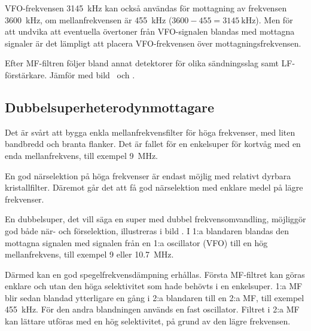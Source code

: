 \begin{exempelbox}
VFO-frekvensen \qty{3145}{\kilo\hertz} kan också användas för mottagning av
frekvensen \qty{3600}{\kilo\hertz}, om mellanfrekvensen är \qty{455}{\kilo\hertz}
(\(3600 - 455 = \qty{3145}{\kilo\hertz}\)).
Men för att undvika att eventuella övertoner från VFO-signalen blandas med
mottagna signaler är det lämpligt att placera VFO-frekvensen över
mottagningsfrekvensen.
\end{exempelbox}

Efter MF-filtren följer bland annat detektorer för olika sändningsslag samt
LF-förstärkare.
Jämför med bild~ och .

\subsection{Dubbelsuperheterodynmottagare}

Det är svårt att bygga enkla mellanfrekvensfilter för höga frekvenser,
med liten bandbredd och branta flanker.
Det är fallet för en enkelsuper för kortvåg med en enda mellanfrekvens, till
exempel \qty{9}{\mega\hertz}.

En god närselektion på höga frekvenser är endast möjlig med relativt
dyrbara kristallfilter.
Däremot går det att få god närselektion med enklare medel på lägre frekvenser.

En dubbelsuper, det vill säga en super med dubbel frekvensomvandling,
möjliggör god både när- och förselektion, illustreras i bild
.
I 1:a blandaren blandas den mottagna signalen med signalen från en 1:a
oscillator (VFO) till en hög mellanfrekvens, till exempel 9 eller
\qty{10,7}{\mega\hertz}.

Därmed kan en god spegelfrekvensdämpning erhållas.
Första MF-filtret kan göras enklare och utan den höga selektivitet som hade
behövts i en enkelsuper.
1:a MF blir sedan blandad ytterligare en gång i 2:a blandaren till en 2:a MF,
till exempel \qty{455}{\kilo\hertz}.
För den andra blandningen används en fast oscillator.
Filtret i 2:a MF kan lättare utföras med en hög selektivitet, på grund av den
lägre frekvensen.


